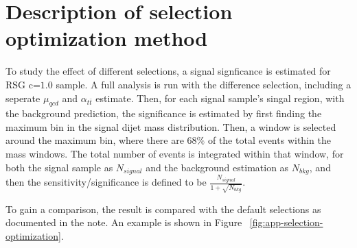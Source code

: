 \section{Description of selection optimization method}
\label{sec:app-selection-optimization}
To study the effect of different selections, a signal signficance is estimated for RSG c=$1.0$ sample. A full analysis is run with the difference selection, including a seperate $\mu_{qcd}$ and $\alpha_{t\bar{t}}$ estimate. Then, for each signal sample's singal region, with the background prediction, the significance is estimated by first finding the maximum bin in the signal dijet mass distribution. Then, a window is selected around the maximum bin, where there are $68\%$ of the total events within the mass windows. The total number of events is integrated within that window, for both the signal sample as $N_{signal}$ and the background estimation as $N_{bkg}$, and then the sensitivity/significance is defined to be $\frac{N_{signal}}{1 + \sqrt{N_{bkg}}}$.

To gain a comparison, the result is compared with the default selections as documented in the note. An example is shown in Figure ~\ref{fig:app-selection-optimization}.

\begin{figure*}[htbp!]
\begin{center}
  \caption{An example of significance comparison plot. On the top pad, the x-axis is for differnt RSG masses, while the y-axis is plotting the estimated significance. The black dot is for the 2$b$s signal region with the specified selection, the red square is for the 3$b$ signal region, and the green star is for the 4$b$ signal region. The red cross is the quaratic sum of the three signal regions above. And the black circile is the default selection total combined significance in this note. At the bottom pad, the x-axis is for differnt RSG masses, while the y-axis is plotting the combined estimated significance ratio of the specified selection to the refernce selection. In this case, $77\%$ working point study is compared to the reference, which has the same $b$-tagging working point. Hence all the ratios are 1.}
  \label{fig:app-selection-optimization}
\end{center}
\end{figure*}
